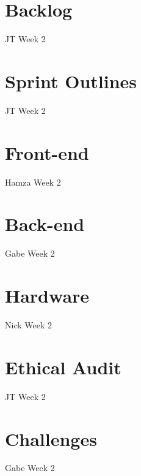 \section{Backlog}
JT Week 2

\section{Sprint Outlines}
JT Week 2

\section{Front-end}
Hamza Week 2

\section{Back-end}
Gabe Week 2

\section{Hardware}
Nick Week 2

\section{Ethical Audit}
JT Week 2

\section{Challenges}
Gabe Week 2